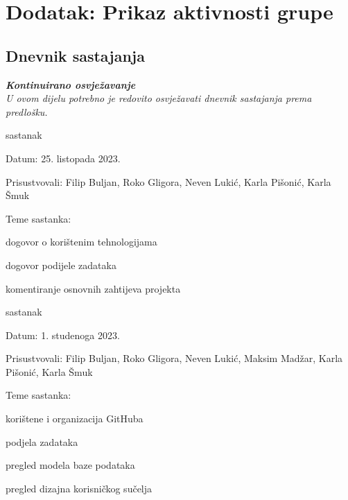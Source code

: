 \chapter*{Dodatak: Prikaz aktivnosti grupe}
		
		\section*{Dnevnik sastajanja}
		
		\textbf{\textit{Kontinuirano osvježavanje}}\\
		
		 \textit{U ovom dijelu potrebno je redovito osvježavati dnevnik sastajanja prema predlošku.}
		
		\begin{packed_enum}
			\item  sastanak
			
			\item[] \begin{packed_item}
				\item Datum: 25. listopada 2023.
				\item Prisustvovali: Filip Buljan, Roko Gligora, Neven Lukić, Karla Pišonić, Karla Šmuk
				\item Teme sastanka:
				\begin{packed_item}
					\item  dogovor o korištenim tehnologijama
					\item  dogovor podijele zadataka
					\item  komentiranje osnovnih zahtijeva projekta
				\end{packed_item}
			\end{packed_item}
			
			\item  sastanak
			\item[] \begin{packed_item}
				\item Datum: 1. studenoga 2023.
				\item Prisustvovali: Filip Buljan, Roko Gligora, Neven Lukić, Maksim Madžar, Karla Pišonić, Karla Šmuk
				\item Teme sastanka:
				\begin{packed_item}
					\item  korištene i organizacija GitHuba
					\item  podjela zadataka
					\item  pregled modela baze podataka
					\item  pregled dizajna korisničkog sučelja
				\end{packed_item}
			\end{packed_item}
		

\end{packed_enum}
